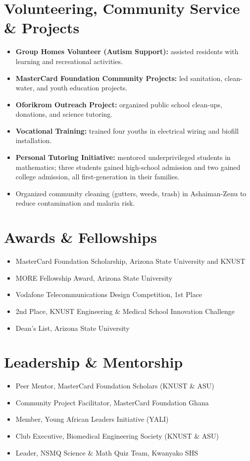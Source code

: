 \documentclass[10.5pt]{article}
\begin{document}
\section*{Volunteering, Community Service \& Projects}
\begin{itemize}
  \item \textbf{Group Homes Volunteer (Autism Support):} assisted residents with learning and recreational activities.
  \item \textbf{MasterCard Foundation Community Projects:} led sanitation, clean-water, and youth education projects.
  \item \textbf{Oforikrom Outreach Project:} organized public school clean-ups, donations, and science tutoring.
  \item \textbf{Vocational Training:} trained four youths in electrical wiring and biofill installation.
  \item \textbf{Personal Tutoring Initiative:} mentored underprivileged students in mathematics; three students gained
  high-school admission and two gained college admission, all first-generation in their families.
  \item Organized community cleaning (gutters, weeds, trash) in Ashaiman-Zenu to reduce contamination and malaria risk.
\end{itemize}

\section*{Awards \& Fellowships}
\begin{itemize}
  \item MasterCard Foundation Scholarship, Arizona State University and KNUST
  \item MORE Fellowship Award, Arizona State University
  \item Vodafone Telecommunications Design Competition, 1st Place
  \item 2nd Place, KNUST Engineering \& Medical School Innovation Challenge
  \item Dean's List, Arizona State University
\end{itemize}

\section*{Leadership \& Mentorship}
\begin{itemize}
  \item Peer Mentor, MasterCard Foundation Scholars (KNUST \& ASU)
  \item Community Project Facilitator, MasterCard Foundation Ghana
  \item Member, Young African Leaders Initiative (YALI)
  \item Club Executive, Biomedical Engineering Society (KNUST \& ASU)
  \item Leader, NSMQ Science \& Math Quiz Team, Kwanyako SHS
\end{itemize}
\end{document}

